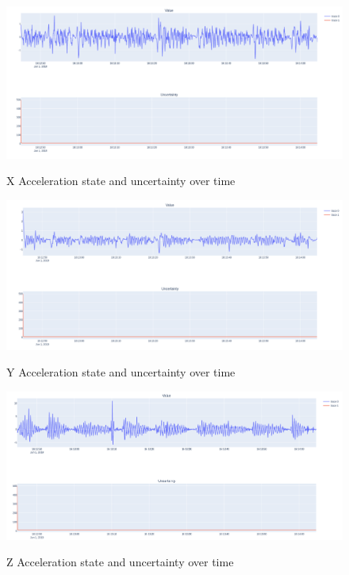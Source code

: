\documentclass[12pt]{article}
\begin{document}
\begin{figure}[H]
    \centering
    \includegraphics[width=\linewidth]{figures/ax_uncertainty.png}\\
    \caption{X Acceleration state and uncertainty over time}
    \label{fig:az}
\end{figure}
\begin{figure}[H]
    \centering
    \includegraphics[width=\linewidth]{figures/ay_uncertainty.png}\\
    \caption{Y Acceleration state and uncertainty over time}
    \label{fig:ay}
\end{figure}
\begin{figure}[H]
    \centering
    \includegraphics[width=\linewidth]{figures/az_uncertainty.png}\\
    \caption{Z Acceleration state and uncertainty over time}
    \label{fig:az}
\end{figure}
\end{document}
